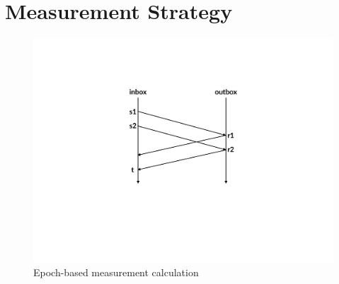 \section{Measurement Strategy}\label{s:measurement}
\begin{figure}
    \centering
    \includegraphics[width=\columnwidth]{img/rate-calculation}
    \caption{Epoch-based measurement calculation}\label{fig:ratecalc}
\end{figure}


